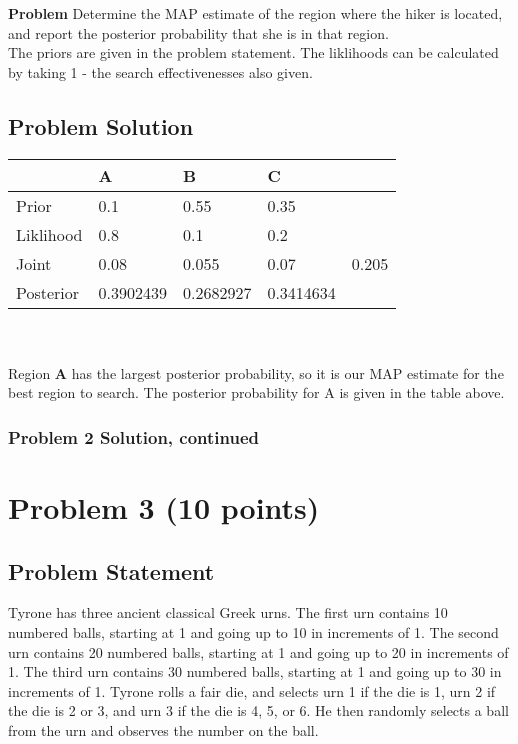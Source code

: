 \documentclass[12pt]{article}
\theoremstyle{definition}
\begin{document}
\bigskip
\noindent
{\bf Problem} Determine the MAP estimate of the region where the hiker is located, and report the posterior probability that she is in that region.\\

The priors are given in the problem statement. The liklihoods can be calculated by taking 1 - the search effectivenesses also given.

\subsection*{Problem Solution}
\begin{tabular}{lllll}
&   A   &   B   &   C   \\
\hline
Prior      &   0.1   &   0.55   &   0.35   &\\
Liklihood  &   0.8   &   0.1   &   0.2   &\\
Joint      &   0.08   &   0.055   &   0.07   &   0.205\\
Posterior  &   0.3902439   &   0.2682927   &   0.3414634   &\\
\hline
\end{tabular}
\\\\

Region \textbf{A} has the largest posterior probability, so it is our MAP estimate for the best region to search. The posterior probability for A is given in the table above.
\newpage
\subsubsection*{Problem 2 Solution, continued}

\newpage
\section*{Problem 3 (10 points)}

\subsection*{Problem Statement}

Tyrone has three ancient classical Greek urns. The first urn contains 10 numbered balls, starting at 1 and going up to 10 in increments of 1. The second urn contains 20 numbered balls, starting at 1 and going up to 20 in increments of 1. The third urn contains 30 numbered balls, starting at 1 and going up to 30 in increments of 1. Tyrone rolls a fair die, and selects urn 1 if the die is 1, urn 2 if the die is 2 or 3, and urn 3 if the die is 4, 5, or 6. He then randomly selects a ball from the urn and observes the number on the ball.
\end{document}
